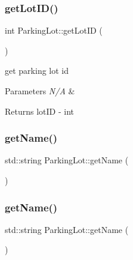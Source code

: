 \mbox{\label{class_parking_lot_ac6269a82ab516553047cefacc229e5e0}} 
\subsubsection{\texorpdfstring{get\+Lot\+I\+D()}{getLotID()}\hspace{0.1cm}{\footnotesize\ttfamily [2/2]}}
{\footnotesize\ttfamily int Parking\+Lot\+::get\+Lot\+ID (\begin{DoxyParamCaption}{ }\end{DoxyParamCaption})}



get parking lot id 


\begin{DoxyParams}{Parameters}
{\em N/A} & \\
\hline
\end{DoxyParams}
\begin{DoxyReturn}{Returns}
lot\+ID -\/ int 
\end{DoxyReturn}
\mbox{\label{class_parking_lot_a4d1dc6ef9517b87a9bfff1fd64c8cb41}} 
\subsubsection{\texorpdfstring{get\+Name()}{getName()}\hspace{0.1cm}{\footnotesize\ttfamily [1/2]}}
{\footnotesize\ttfamily std\+::string Parking\+Lot\+::get\+Name (\begin{DoxyParamCaption}{ }\end{DoxyParamCaption})}

\mbox{\label{class_parking_lot_a4d1dc6ef9517b87a9bfff1fd64c8cb41}} 
\subsubsection{\texorpdfstring{get\+Name()}{getName()}\hspace{0.1cm}{\footnotesize\ttfamily [2/2]}}
{\footnotesize\ttfamily std\+::string Parking\+Lot\+::get\+Name (\begin{DoxyParamCaption}{ }\end{DoxyParamCaption})}



